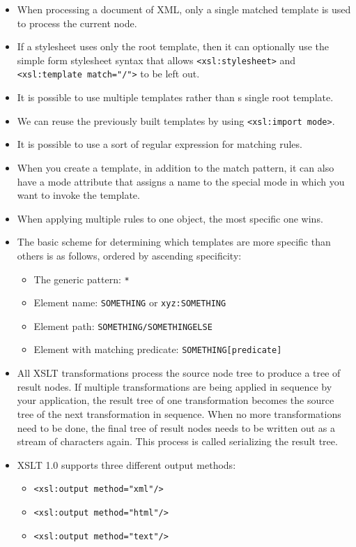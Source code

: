         \begin{itemize}
		\item When processing a document of XML, only a single matched template is used to process the current node.
		\item If a stylesheet uses only the root template, then it can optionally use the simple form stylesheet syntax that allows \verb~<xsl:stylesheet>~ and \verb~<xsl:template match="/">~ to be left out.
		\item It is possible to use multiple templates rather than s single root template.
        \item We can reuse the previously built templates by using \verb~<xsl:import mode>~.
		\item It is possible to use a sort of regular expression for matching rules.
		\item When you create a template, in addition to the match pattern, it can also have a mode attribute that assigns a name to the special mode in which you want to invoke the template.
		\item When applying multiple rules to one object, the most specific one wins.
		\item The basic scheme for determining which templates are more specific than others is as follows, ordered by ascending specificity:
		\begin{itemize} 
		    \item The generic pattern: \verb|*| 
		    \item Element name: \verb|SOMETHING| or \verb|xyz:SOMETHING|
		    \item Element path: \verb|SOMETHING/SOMETHINGELSE|
		    \item Element with matching predicate: \verb|SOMETHING[predicate]|
	    \end{itemize}
		\item All XSLT transformations process the source node tree to produce a tree of result nodes. If multiple transformations are being applied in sequence by your application, the result tree of one transformation becomes the source tree of the next transformation in sequence. When no more transformations need to be done, the final tree of result nodes needs to be written out as a stream of characters again. This process is called serializing the result tree.
		\item XSLT 1.0 supports three different output methods:
		    \begin{itemize}
            \item \verb~<xsl:output method=~{\color{red}\verb|"xml"|}\verb|/>|
		    \item \verb~<xsl:output method=~{\color{red}\verb|"html"|}\verb|/>|
		    \item \verb~<xsl:output method=~{\color{red}\verb|"text"|}\verb|/>|
	        \end{itemize}
        \end{itemize}
        

